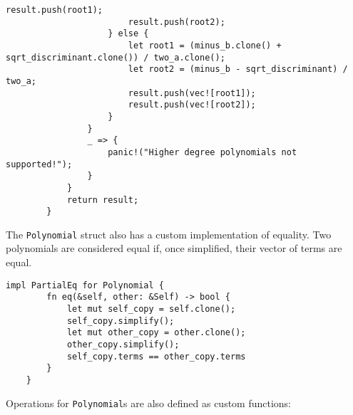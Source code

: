 \begin{lstlisting}[caption={The implementation of the \texttt{roots()} method for the \texttt{Polynomial} struct}, label={lst:polynomial-roots}]
                        result.push(root1);
                        result.push(root2);
                    } else {
                        let root1 = (minus_b.clone() + sqrt_discriminant.clone()) / two_a.clone();
                        let root2 = (minus_b - sqrt_discriminant) / two_a;
                        result.push(vec![root1]);
                        result.push(vec![root2]);
                    }
                }
                _ => {
                    panic!("Higher degree polynomials not supported!");
                }
            }
            return result;
        }
    \end{lstlisting}

The \verb|Polynomial| struct also has a custom implementation of equality. Two polynomials are considered equal if, once simplified, their vector of terms are equal.

    \begin{lstlisting}[caption={The implementation of \texttt{PartialEq} for the \texttt{Polynomial} struct}, label={lst:polynomial-eq}]
    impl PartialEq for Polynomial {
        fn eq(&self, other: &Self) -> bool {
            let mut self_copy = self.clone();
            self_copy.simplify();
            let mut other_copy = other.clone();
            other_copy.simplify();
            self_copy.terms == other_copy.terms
        }
    }
    \end{lstlisting}

Operations for \verb|Polynomial|s are also defined as custom functions:

